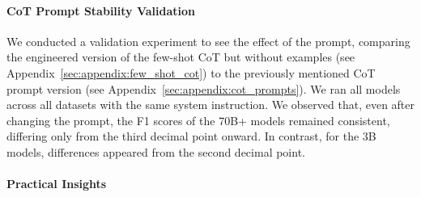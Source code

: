 \documentclass[11pt]{article}
\begin{document}

\paragraph{CoT Prompt Stability Validation}
We conducted a validation experiment to see the effect of the prompt, comparing the engineered version of the few-shot CoT but without examples (see Appendix~\ref{sec:appendix:few_shot_cot}) to the previously mentioned CoT prompt version (see Appendix~\ref{sec:appendix:cot_prompts}). We ran all models across all datasets with the same system instruction. We observed that, even after changing the prompt, the F1 scores of the 70B+ models remained consistent, differing only from the third decimal point onward. In contrast, for the 3B models, differences appeared from the second decimal point.




\paragraph{Practical Insights}
\end{document}

